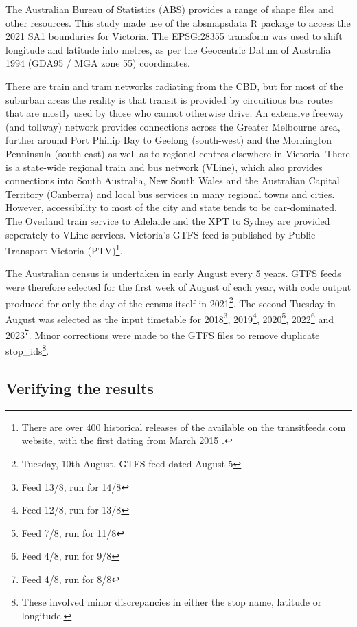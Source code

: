 \documentclass[]{tufte-book}
\begin{document}
The Australian Bureau of Statistics (ABS) provides a range of shape
files and other resources. This study made use of the absmapsdata R
package \citep{R-absmapsdata} to access the 2021 SA1 boundaries for
Victoria. The EPSG:28355 transform \citep{EPSG_28355} was used to shift
longitude and latitude into metres, as per the Geocentric Datum of
Australia 1994 (GDA95 / MGA zone 55) coordinates.

There are train and tram networks radiating from the CBD, but for most
of the suburban areas the reality is that transit is provided by
circuitious bus routes that are mostly used by those who cannot
otherwise drive. An extensive freeway (and tollway) network provides
connections across the Greater Melbourne area, further around Port
Phillip Bay to Geelong (south-west) and the Mornington Penninsula
(south-east) as well as to regional centres elsewhere in Victoria. There
is a state-wide regional train and bus network (VLine), which also
provides connections into South Australia, New South Wales and the
Australian Capital Territory (Canberra) and local bus services in many
regional towns and cities. However, accessibility to most of the city
and state tends to be car-dominated. The Overland train service to
Adelaide and the XPT to Sydney are provided seperately to VLine
services. Victoria's GTFS feed is published by Public Transport Victoria
(PTV)\footnote{There are over 400 historical releases of the available
  on the transitfeeds.com website, with the first dating from March 2015
  \citep{transitfeeds_victoria:2023aa}.}.

The Australian census is undertaken in early August every 5 years. GTFS
feeds were therefore selected for the first week of August of each year,
with code output produced for only the day of the census itself in
2021\footnote{Tuesday, 10th August. GTFS feed dated August 5}. The
second Tuesday in August was selected as the input timetable for
2018\footnote{Feed 13/8, run for 14/8}, 2019\footnote{Feed 12/8, run for
  13/8}, 2020\footnote{Feed 7/8, run for 11/8}, 2022\footnote{Feed 4/8,
  run for 9/8} and 2023\footnote{Feed 4/8, run for 8/8}. Minor
corrections were made to the GTFS files to remove duplicate
stop\_ids\footnote{These involved minor discrepancies in either the stop
  name, latitude or longitude.}.

\hypertarget{verifying-the-results}{%
\subsection{Verifying the results}\label{verifying-the-results}}
\end{document}
